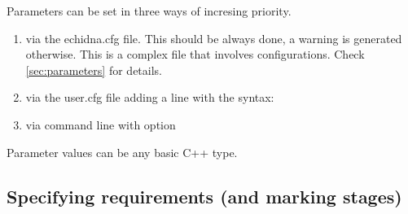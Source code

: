 Parameters can be set in three ways of incresing priority.
\begin{enumerate}
\item
  via the echidna.cfg file. This should be always done, a warning is generated otherwise.
  This is a complex file that involves configurations. Check \ref{sec:parameters} for details.

\item
  via the user.cfg file adding a line with the syntax: 


\item
  via command line with option 

\end{enumerate}

Parameter values can be any basic C++ type.

\subsection{Specifying requirements (and marking stages)}
\label{sec:requirements}

